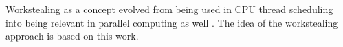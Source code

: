 Workstealing as a concept evolved from being used in CPU thread scheduling \cite{blumofeSchedulingMultithreadedComputations1999} into being relevant in parallel computing as well \cite{letzWorkStealingScheduler2010,mattheisWorkStealingStrategies2012,prellEmbracingExplicitCommunication2016}. The idea of the workstealing approach is based on this work.

